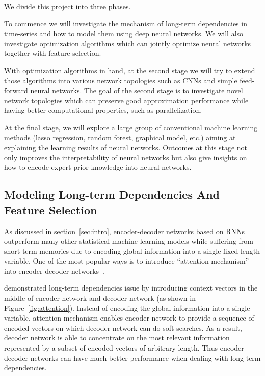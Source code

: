 \documentclass{article} \usepackage{tabularx}
\renewcommand{\citename}{\citet} \renewcommand{\cite}{\citep}
\begin{document}
We divide this project into three phases.

To commence we will investigate the mechanism of long-term
dependencies in time-series and how to model them using deep
neural networks. We will also investigate optimization algorithms
which can jointly optimize neural networks together with feature
selection.

With optimization algorithms in hand, at the second stage we will
try to extend those algorithms into various network topologies
such as CNNs and simple feed-forward neural networks. The goal of
the second stage is to investigate novel network topologies which
can preserve good approximation performance while having better
computational properties, such as parallelization.

At the final stage, we will explore a large group of conventional
machine learning methods (lasso regression, random forest,
graphical model, etc.) aiming at explaining the learning results
of neural networks. Outcomes at this stage not only improves the
interpretability of neural networks but also give insights on how
to encode expert prior knowledge into neural networks.

\subsection{Modeling Long-term Dependencies And Feature
  Selection}
\label{sec:ltfs}

As discussed in section~\ref{sec:intro}, encoder-decoder networks
based on RNNs outperform many other statistical machine learning
models while suffering from short-term memories due to encoding
global information into a single fixed length variable. One of
the most popular ways is to introduce ``attention mechanism''
into encoder-decoder networks~\cite{attention}.

\citename{attention} demonstrated long-term dependencies issue by
introducing context vectors in the middle of encoder network and
decoder network (as shown in Figure~\ref{fig:attention}). Instead
of encoding the global information into a single variable,
attention mechanism enables encoder network to provide a sequence
of encoded vectors on which decoder network can do soft-searches.
As a result, decoder network is able to concentrate on the most
relevant information represented by a subset of encoded vectors
of arbitrary length. Thus encoder-decoder networks can have much
better performance when dealing with long-term dependencies.
\end{document}
